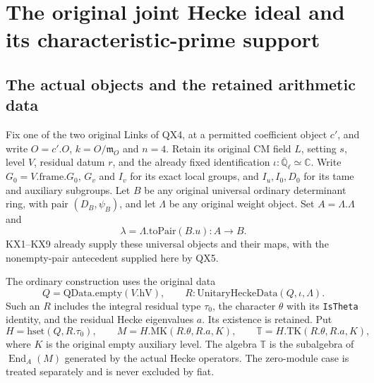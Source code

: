\section{The original joint Hecke ideal and its characteristic-prime support}
\label{sec:joint-support-producer}


\subsection{The actual objects and the retained arithmetic data}

Fix one of the two original Links of QX4, at a permitted coefficient
object $c'$, and write $O=c'.O$, $k=O/\mathfrak m_O$ and $n=4$.
Retain its original CM field $L$, setting $s$, level $V$, residual
datum $r$, and the already fixed identification
$\iota:\overline{\mathbb Q}_\ell\simeq\mathbb C$.
Write $G_0=V.\mathrm{frame}.G_0$, $G_v$ and $I_v$ for its exact
local groups, and $I_u,I_0,D_0$ for its tame and auxiliary subgroups.
Let $B$ be any original universal ordinary determinant ring, with
pair $(D_B,\psi_B)$, and let $\Lambda$ be any original weight object.
Set $A=\Lambda.\Lambda$ and
\[
 \lambda=\Lambda.\mathrm{toPair}(B.u):A\longrightarrow B.
 \tag{JSP.1}
\]
KX1--KX9 already supply these universal objects and their maps, with
the nonempty-pair antecedent supplied here by QX5.

The ordinary construction uses the original data
\[
 Q=\mathrm{QData.empty}(V.\mathrm{hV}),\qquad
 R:\mathrm{UnitaryHeckeData}(Q,\iota,\Lambda).
\]
Such an $R$ includes
the integral residual type $\tau_0$, the character $\theta$ with its
\texttt{IsTheta} identity, and the residual Hecke eigenvalues $a$.
Its existence is retained. Put
\[
 H=\mathrm{hset}(Q,R.\tau_0),\qquad
 M=H.\mathrm{MK}(R.\theta,R.a,K),\qquad
 \mathbb T=H.\mathrm{TK}(R.\theta,R.a,K),                \tag{JSP.2}
\]
where $K$ is the original empty auxiliary level. The algebra
$\mathbb T$ is the subalgebra of $\operatorname{End}_A(M)$ generated
by the actual Hecke operators. The zero-module case is treated
separately and is never excluded by fiat.

